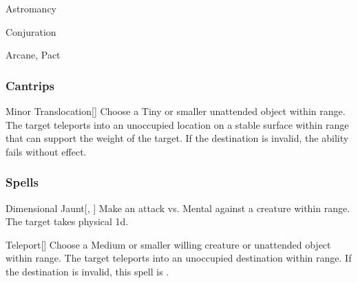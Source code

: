 \newpage
\begin{spellsection}{Astromancy}

\begin{spellheader}
\end{spellheader}


 Conjuration

 Arcane, Pact

\subsubsection{Cantrips}


\begin{apability}{Minor Translocation}[]
Choose a Tiny or smaller unattended object within \rngclose range.
The target teleports into an unoccupied location on a stable surface within range that can support the weight of the target.
If the destination is invalid, the ability fails without effect.
\end{apability}

\end{spellsection}


\subsubsection{Spells}


\lowercase{\hypertarget{spell:Dimensional Jaunt}{}}\label{spell:Dimensional Jaunt}
\begin{freeability}[\nth{1}]{\hypertarget{spell:Dimensional Jaunt}{Dimensional Jaunt}}[, ]
Make an attack vs. Mental against a creature within \rngmed range.
\hit The target takes physical  \plus1d.
\end{freeability}
\vspace{0.25em}



\lowercase{\hypertarget{spell:Teleport}{}}\label{spell:Teleport}
\begin{freeability}[\nth{1}]{\hypertarget{spell:Teleport}{Teleport}}[]
Choose a Medium or smaller willing creature or unattended object within \rngclose range.
The target teleports into an unoccupied destination within range.
If the destination is invalid, this spell is .
\end{freeability}
\vspace{0.25em}



